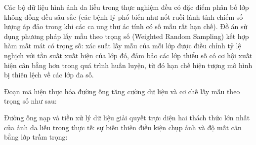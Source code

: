 Các bộ dữ liệu hình ảnh da liễu trong thực nghiệm đều có đặc điểm phân bố lớp không đồng đều sâu sắc (các bệnh lý phổ biến như nốt ruồi lành tính chiếm số lượng áp đảo trong khi các ca ung thư ác tính có số mẫu rất hạn chế). Đồ án sử dụng phương pháp lấy mẫu theo trọng số (Weighted Random Sampling) kết hợp hàm mất mát có trọng số: xác suất lấy mẫu của mỗi lớp được điều chỉnh tỷ lệ nghịch với tần suất xuất hiện của lớp đó, đảm bảo các lớp thiểu số có cơ hội xuất hiện cân bằng hơn trong quá trình huấn luyện, từ đó hạn chế hiện tượng mô hình bị thiên lệch về các lớp đa số.

Đoạn mã hiện thực hóa đường ống tăng cường dữ liệu và cơ chế lấy mẫu theo trọng số như sau:

Đường ống nạp và tiền xử lý dữ liệu giải quyết trực diện hai thách thức lớn nhất của ảnh da liễu trong thực tế: sự biến thiên điều kiện chụp ảnh và độ mất cân bằng lớp trầm trọng:
